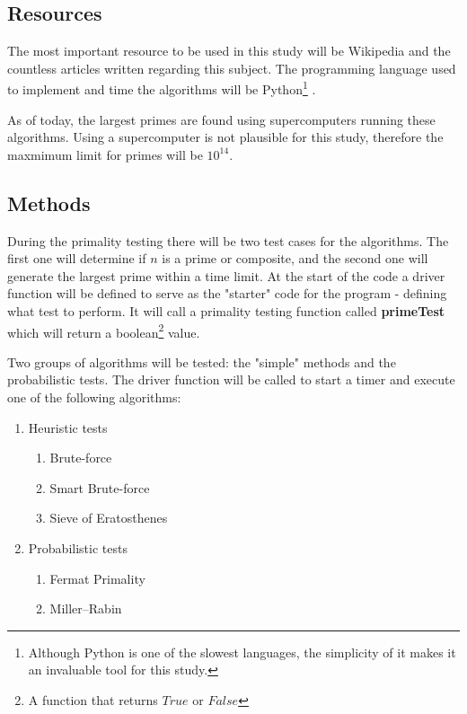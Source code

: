 \documentclass[main.tex]{subfiles}
\begin{document}
\subsection{Resources}

The most important resource to be used in this study will be Wikipedia and the countless articles written regarding this subject. The programming language used to implement and time the algorithms will be Python\footnote{Although Python is one of the slowest languages, the simplicity of it makes it an invaluable tool for this study.} \cite{python}.

As of today, the largest primes are found using supercomputers running these algorithms. Using a supercomputer is not plausible for this study, therefore the maxmimum limit for primes will be $10^{14}$.

\subsection{Methods}
During the primality testing \cite{prime:test} there will be two test cases for the algorithms. The first one will determine if $n$ is a prime or composite, and the second one will generate the largest prime within a time limit. At the start of the code a driver function will be defined to serve as the "starter" code for the program - defining what test to perform. It will call a primality testing function called \textbf{primeTest} which will return a boolean\footnote{A function that returns $True$ or $False$} value. 

Two groups of algorithms will be tested: the "simple" methods and the probabilistic tests. The driver function will be called to start a timer and execute one of the following algorithms:
\begin{enumerate}
    \item Heuristic tests
    \begin{enumerate}
        \item Brute-force%
        \item Smart Brute-force %
        \item Sieve of Eratosthenes \cite{prime:sieve}
    \end{enumerate}
    \item Probabilistic tests \cite{prime:test}
    \begin{enumerate}
        \item Fermat Primality
        \item Miller–Rabin
    \end{enumerate}
\end{enumerate}
\end{document}
